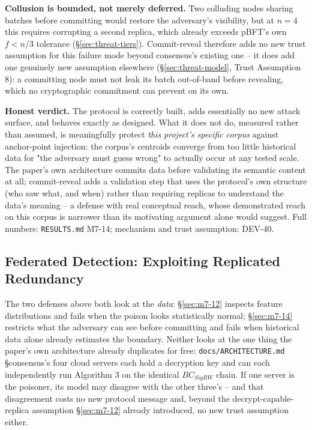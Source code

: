\documentclass[conference]{IEEEtran}
\begin{document}
\textbf{Collusion is bounded, not merely deferred.} Two colluding nodes sharing batches before
committing would restore the adversary's visibility, but at $n{=}4$ this requires corrupting a
second replica, which already exceeds pBFT's own $f<n/3$ tolerance (\S\ref{sec:threat-tiers}).
Commit-reveal therefore adds no new trust assumption for this failure mode beyond consensus's
existing one -- it does add one genuinely new assumption elsewhere (\S\ref{sec:threat-model},
Trust Assumption 8): a committing node must not leak its batch out-of-band before revealing,
which no cryptographic commitment can prevent on its own.

\textbf{Honest verdict.} The protocol is correctly built, adds essentially no new attack surface,
and behaves exactly as designed. What it does not do, measured rather than assumed, is
meaningfully protect \emph{this project's specific corpus} against anchor-point injection: the
corpus's centroids converge from too little historical data for "the adversary must guess wrong"
to actually occur at any tested scale. The paper's own architecture commits data before validating
its semantic content at all; commit-reveal adds a validation step that uses the protocol's own
structure (who saw what, and when) rather than requiring replicas to understand the data's
meaning -- a defense with real conceptual reach, whose demonstrated reach on this corpus is
narrower than its motivating argument alone would suggest. Full numbers: \texttt{RESULTS.md} M7-14;
mechanism and trust assumption: DEV-40.

\subsection{Federated Detection: Exploiting Replicated Redundancy}
\label{sec:m7-15}

The two defenses above both look at the \emph{data}: \S\ref{sec:m7-12} inspects feature
distributions and fails when the poison looks statistically normal; \S\ref{sec:m7-14} restricts
what the adversary can see before committing and fails when historical data alone already
estimates the boundary. Neither looks at the one thing the paper's own architecture already
duplicates for free: \texttt{docs/ARCHITECTURE.md} \S consensus's four cloud servers each hold a
decryption key and can each independently run Algorithm 3 on the identical \(BC_{SigRW}\) chain.
If one server is the poisoner, its model may disagree with the other three's -- and that
disagreement costs no new protocol message and, beyond the decrypt-capable-replica assumption
\S\ref{sec:m7-12} already introduced, no new trust assumption either.
\end{document}
